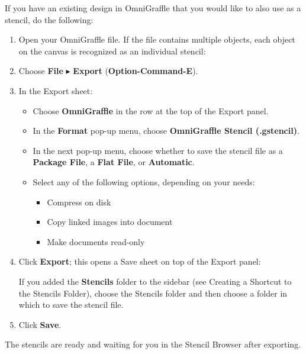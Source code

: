 \documentclass[../main.tex]{subfiles}
\begin{document}
If you have an existing design in OmniGraffle that you would like to also use as a stencil, do
the following:

\begin{enumerate}
\item Open your OmniGraffle file. If the file contains multiple objects, each object on the
  canvas is recognized as an individual stencil:

\item Choose \textbf{File} $\blacktriangleright$ \textbf{Export} (\textbf{Option-Command-E}).
\item In the Export sheet:


  \begin{itemize}
    \item Choose \textbf{OmniGraffle} in the row at the top of the Export panel.
    \item In the \textbf{Format} pop-up menu, choose \textbf{OmniGraffle Stencil (.gstencil)}.
    \item In the next pop-up menu, choose whether to save the stencil file as a \textbf{Package
      File}, a \textbf{Flat File}, or \textbf{Automatic}.
    \item Select any of the following options, depending on your needs:

      \begin{itemize}
        \item Compress on disk
        \item Copy linked images into document
        \item Make documents read-only
      \end{itemize}
  \end{itemize}
\item Click \textbf{Export}; this opens a Save sheet on top of the Export panel:


  If you added the \textbf{Stencils} folder to the sidebar (see Creating a Shortcut to the
  Stencils Folder), choose the Stencils folder and then choose a folder in which to save the
  stencil file.
\item Click \textbf{Save}.
\end{enumerate}

The stencils are ready and waiting for you in the Stencil Browser after exporting.
\end{document}
